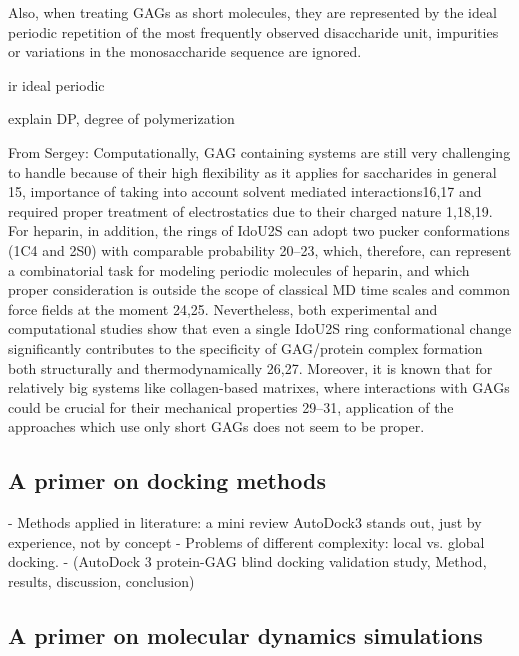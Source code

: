 Also, when treating GAGs as short molecules, they are represented by the ideal
periodic repetition of the most frequently observed disaccharide unit,
impurities or variations in the monosaccharide sequence are ignored.

ir ideal periodic

explain DP, degree of polymerization


From Sergey: Computationally, GAG containing systems are still very challenging
to handle because of their high flexibility as it applies for saccharides in
general 15, importance of taking into account solvent mediated interactions16,17
and required proper treatment of electrostatics due to their charged nature
1,18,19. For heparin, in addition, the rings of IdoU2S can adopt two pucker
conformations (1C4 and 2S0) with comparable probability 20–23, which, therefore,
can represent a combinatorial task for modeling periodic molecules of heparin,
and which proper consideration is outside the scope of classical MD time scales
and common force fields at the moment 24,25. Nevertheless, both experimental and
computational studies show that even a single IdoU2S ring conformational change
significantly contributes to the specificity of GAG/protein complex formation
both structurally and thermodynamically 26,27. Moreover, it is known
that for relatively big systems like collagen-based matrixes, where interactions
with GAGs could be crucial for their mechanical properties 29–31, application of
the approaches which use only short GAGs does not seem to be proper.



\subsection{A primer on docking methods}


    - Methods applied in literature: a mini review
        AutoDock3 stands out, just by experience, not by concept
    - Problems of different complexity: local vs. global docking.
    - (AutoDock 3 protein-GAG blind docking validation study,
        Method, results, discussion, conclusion)

\lipsum[1-5]

\subsection{A primer on molecular dynamics simulations}

